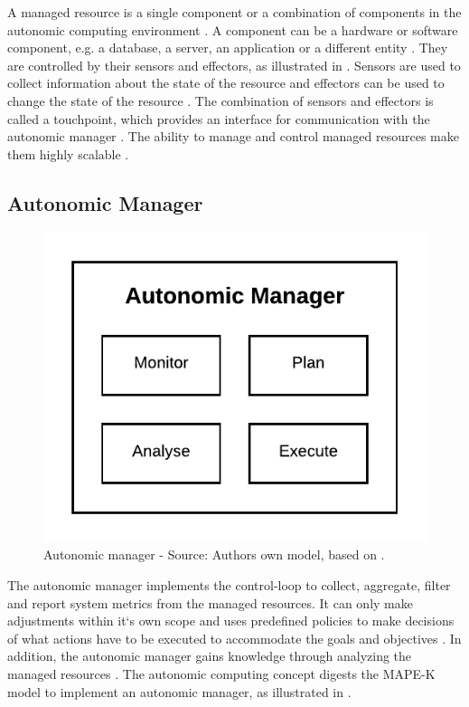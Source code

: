 A managed resource is a single component or a combination of components in the autonomic computing environment \cite{Murch2004Autonomic, Jacob2004AutonomicSolution}. A component can be a hardware or software component, e.g. a database, a server, an application or a different entity \cite{Sinreich2006AnAB}.
They are controlled by their sensors and effectors, as illustrated in . Sensors are used to collect information about the state of the resource and effectors can be used to change the state of the resource \cite{Jacob2004AutonomicSolution}. The combination of sensors and effectors is called a touchpoint, which provides an interface for communication with the autonomic manager \cite{Sinreich2006AnAB}.
The ability to manage and control managed resources make them highly scalable \cite{Murch2004Autonomic}.


\subsection{Autonomic Manager}
\label{subsec:02_ac_manager}

\begin{figure}[h]
\centering
\includegraphics[scale=1]{images/02_theoretical_foundation/autonomic_computing/autonomic_manager}
\caption{Autonomic manager - Source: Authors own model, based on \cite{Jacob2004AutonomicSolution}.}
\label{fig:ac_manager}
\end{figure}

The autonomic manager implements the control-loop to collect, aggregate, filter and report system metrics from the managed resources. It can only make adjustments within it`s own scope and uses predefined policies to make decisions of what actions have to be executed to accommodate the goals and objectives \cite{Murch2004Autonomic, Sinreich2006AnAB}.
In addition, the autonomic manager gains knowledge through analyzing the managed resources \cite{Murch2004Autonomic}.
The autonomic computing concept digests the MAPE-K model to implement an autonomic manager, as illustrated in  \cite{Goscinski2011CloudComputing}.

